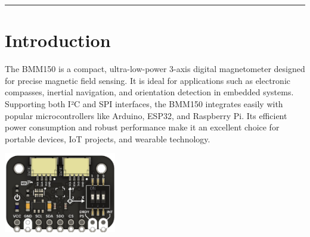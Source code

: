 \documentclass[10pt]{article}
\title{}
\author{}
\date{}
\begin{document}
\noindent
{}
\vspace{1em}
\hrule
\vspace{1.5em}

\section*{Introduction}
\vspace{0.5em}
\noindent
\begin{minipage}[t]{0.62\textwidth}
\setlength{\parskip}{0.75em}
\justifying
The BMM150 is a compact, ultra-low-power 3-axis digital magnetometer designed for precise magnetic field sensing. It is ideal for applications such as electronic compasses, inertial navigation, and orientation detection in embedded systems. Supporting both I²C and SPI interfaces, the BMM150 integrates easily with popular microcontrollers like Arduino, ESP32, and Raspberry Pi. Its efficient power consumption and robust performance make it an excellent choice for portable devices, IoT projects, and wearable technology.
\end{minipage}
\hfill
\begin{minipage}[t]{0.35\textwidth}
\centering
\vspace{-0.5em}
\includegraphics[height=3.5cm,keepaspectratio]{./images/product.png}
\end{minipage}

\vspace{1.0em}
\FloatBarrier %
\end{document}
